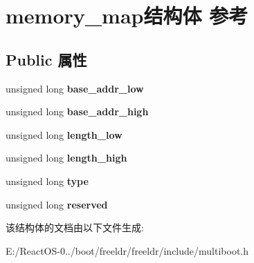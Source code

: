 \hypertarget{structmemory__map}{}\section{memory\+\_\+map结构体 参考}
\label{structmemory__map}
\subsection*{Public 属性}
\begin{DoxyCompactItemize}
\item 
\mbox{\label{structmemory__map_a81d0a5c81c584b1dfefb29eb565ced21}} 
unsigned long {\bfseries base\+\_\+addr\+\_\+low}
\item 
\mbox{\label{structmemory__map_ac2c50595b63c7c6d9e09a26d8ff82a80}} 
unsigned long {\bfseries base\+\_\+addr\+\_\+high}
\item 
\mbox{\label{structmemory__map_a8498847818d49c539c0d2c9c8abedc90}} 
unsigned long {\bfseries length\+\_\+low}
\item 
\mbox{\label{structmemory__map_acda914c5b912796f320848c0ba36eed3}} 
unsigned long {\bfseries length\+\_\+high}
\item 
\mbox{\label{structmemory__map_aa133383a0820f52669530f483d2a8d14}} 
unsigned long {\bfseries type}
\item 
\mbox{\label{structmemory__map_aa8fbd4b6b5dd5a387ff2a9596dc8944d}} 
unsigned long {\bfseries reserved}
\end{DoxyCompactItemize}


该结构体的文档由以下文件生成\+:\begin{DoxyCompactItemize}
\item 
E\+:/\+React\+O\+S-\/0../boot/freeldr/freeldr/include/multiboot.\+h\end{DoxyCompactItemize}
